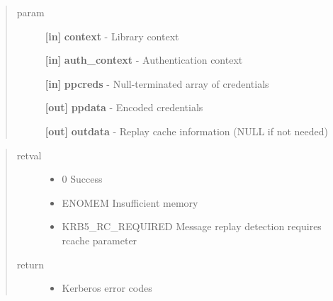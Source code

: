 \documentclass[letterpaper,10pt,english]{sphinxmanual}
\begin{document}
\begin{fulllineitems}
\label{appdev/refs/api/krb5_mk_ncred:c.krb5_mk_ncred}
\end{fulllineitems}

\begin{quote}\begin{description}
\item[{param}] \leavevmode
\textbf{{[}in{]}} \textbf{context} - Library context

\textbf{{[}in{]}} \textbf{auth\_context} - Authentication context

\textbf{{[}in{]}} \textbf{ppcreds} - Null-terminated array of credentials

\textbf{{[}out{]}} \textbf{ppdata} - Encoded credentials

\textbf{{[}out{]}} \textbf{outdata} - Replay cache information (NULL if not needed)

\end{description}\end{quote}
\begin{quote}\begin{description}
\item[{retval}] \leavevmode\begin{itemize}
\item {} 
0   Success

\item {} 
ENOMEM   Insufficient memory

\item {} 
KRB5\_RC\_REQUIRED   Message replay detection requires rcache parameter

\end{itemize}

\item[{return}] \leavevmode\begin{itemize}
\item {} 
Kerberos error codes

\end{itemize}

\end{description}\end{quote}
\end{document}
